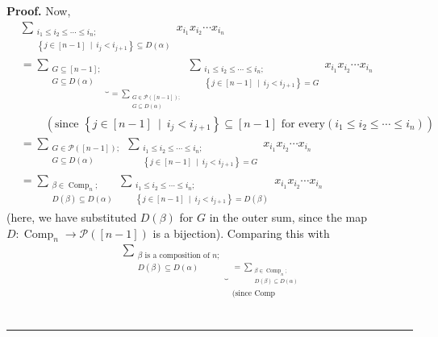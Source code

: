\documentclass[numbers=enddot,12pt,final,onecolumn,notitlepage,abstracton]{scrartcl}
\theoremstyle{definition}
\newenvironment{proof}[1][Proof]{\noindent\textbf{#1.} }{\ \rule{0.5em}{0.5em}}
\let\sumnonlimits\sum
\renewcommand{\sum}{\sumnonlimits\limits}
\newenvironment{verlong}{}{}
\begin{document}
\begin{verlong}
\begin{footnotesize}
\begin{proof}
Now,%
\begin{align*}
&  \sum_{\substack{i_{1}\leq i_{2}\leq\cdots\leq i_{n};\\\left\{  j\in\left[
n-1\right]  \ \mid\ i_{j}<i_{j+1}\right\}  \subseteq D\left(  \alpha\right)
}}x_{i_{1}}x_{i_{2}}\cdots x_{i_{n}}\\
&  =\underbrace{\sum_{\substack{G\subseteq\left[  n-1\right]  ;\\G\subseteq
D\left(  \alpha\right)  }}}_{=\sum_{\substack{G\in\mathcal{P}\left(  \left[
n-1\right]  \right)  ;\\G\subseteq D\left(  \alpha\right)  }}}\sum
_{\substack{i_{1}\leq i_{2}\leq\cdots\leq i_{n};\\\left\{  j\in\left[
n-1\right]  \ \mid\ i_{j}<i_{j+1}\right\}  =G}}x_{i_{1}}x_{i_{2}}\cdots
x_{i_{n}}\\
&  \ \ \ \ \ \ \ \ \ \ \left(  \text{since }\left\{  j\in\left[  n-1\right]
\ \mid\ i_{j}<i_{j+1}\right\}  \subseteq\left[  n-1\right]  \text{ for every
}\left(  i_{1}\leq i_{2}\leq\cdots\leq i_{n}\right)  \right) \\
&  =\sum_{\substack{G\in\mathcal{P}\left(  \left[  n-1\right]  \right)
;\\G\subseteq D\left(  \alpha\right)  }}\sum_{\substack{i_{1}\leq i_{2}%
\leq\cdots\leq i_{n};\\\left\{  j\in\left[  n-1\right]  \ \mid\ i_{j}%
<i_{j+1}\right\}  =G}}x_{i_{1}}x_{i_{2}}\cdots x_{i_{n}}\\
&  =\sum_{\substack{\beta\in\operatorname*{Comp}\nolimits_{n};\\D\left(
\beta\right)  \subseteq D\left(  \alpha\right)  }}\sum_{\substack{i_{1}\leq
i_{2}\leq\cdots\leq i_{n};\\\left\{  j\in\left[  n-1\right]  \ \mid
\ i_{j}<i_{j+1}\right\}  =D\left(  \beta\right)  }}x_{i_{1}}x_{i_{2}}\cdots
x_{i_{n}}%
\end{align*}
(here, we have substituted $D\left(  \beta\right)  $ for $G$ in the outer sum,
since the map $D:\operatorname*{Comp}\nolimits_{n}\rightarrow\mathcal{P}%
\left(  \left[  n-1\right]  \right)  $ is a bijection). Comparing this with%
\begin{align*}
&  \underbrace{\sum_{\substack{\beta\text{ is a composition of }n;\\D\left(
\beta\right)  \subseteq D\left(  \alpha\right)  }}}_{\substack{=\sum
_{\substack{\beta\in\operatorname*{Comp}\nolimits_{n};\\D\left(  \beta\right)
\subseteq D\left(  \alpha\right)  }}\\\text{(since }\operatorname*{Comp}%
}}
\end{align*}
\end{proof}
\end{footnotesize}
\end{verlong}
\end{document}
